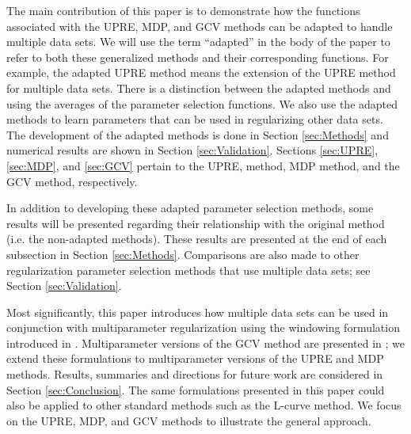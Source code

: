 \documentclass[12pt]{article}
\begin{document}
The main contribution of this paper is to demonstrate how the functions associated with the UPRE, MDP, and GCV methods can be adapted to handle multiple data sets. We will use the term ``adapted'' in the body of the paper to refer to both these generalized methods and their corresponding functions. For example, the adapted UPRE method means the extension of the UPRE method for multiple data sets. There is a distinction between the adapted methods and using the averages of the parameter selection functions. We also use the adapted methods to learn parameters that can be used in regularizing other data sets. The development of the adapted methods is done in Section \ref{sec:Methods} and numerical results are shown in Section \ref{sec:Validation}. Sections \ref{sec:UPRE}, \ref{sec:MDP}, and \ref{sec:GCV} pertain to the UPRE, method, MDP method, and the GCV method, respectively.  \par 
In addition to developing these adapted parameter selection methods, some results will be presented regarding their relationship with the original method (i.e. the non-adapted methods). These results are presented at the end of each subsection in Section \ref{sec:Methods}. Comparisons are also made to other regularization parameter selection methods that use multiple data sets; see Section \ref{sec:Validation}. \par
Most significantly, this paper introduces how multiple data sets can be used in conjunction with multiparameter regularization using the windowing formulation introduced in \cite{ChungEasleyOLeary}. Multiparameter versions of the GCV method are presented in \cite{ChungEasleyOLeary,ModarresiGolub2}; we extend these formulations to multiparameter versions of the UPRE and MDP methods. Results, summaries and directions for future work are considered in Section \ref{sec:Conclusion}. The same formulations presented in this paper could also be applied to other standard methods such as the L-curve method. We focus on the UPRE, MDP, and GCV methods to illustrate the general approach.
\end{document}
